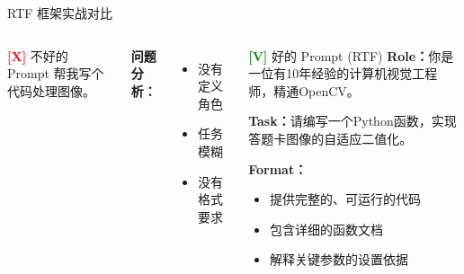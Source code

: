 \begin{frame}{RTF 框架实战对比}
	\begin{columns}
		\begin{alertblock}{\textcolor{red}{\textbf{[X]}} 不好的 Prompt}
			帮我写个代码处理图像。
		\end{alertblock}

		\vspace{0.3cm}

		\textbf{问题分析：}
		\begin{itemize}
			\item 没有定义角色
			\item 任务模糊
			\item 没有格式要求
		\end{itemize}

		\begin{exampleblock}{\textcolor{green}{\textbf{[V]}} 好的 Prompt (RTF)}
			\textbf{Role：}你是一位有10年经验的计算机视觉工程师，精通OpenCV。

			\vspace{0.2cm}

			\textbf{Task：}请编写一个Python函数，实现答题卡图像的自适应二值化。

			\vspace{0.2cm}

			\textbf{Format：}
			\begin{itemize}
				\item 提供完整的、可运行的代码
				\item 包含详细的函数文档
				\item 解释关键参数的设置依据
			\end{itemize}
		\end{exampleblock}
	\end{columns}
\end{frame}



